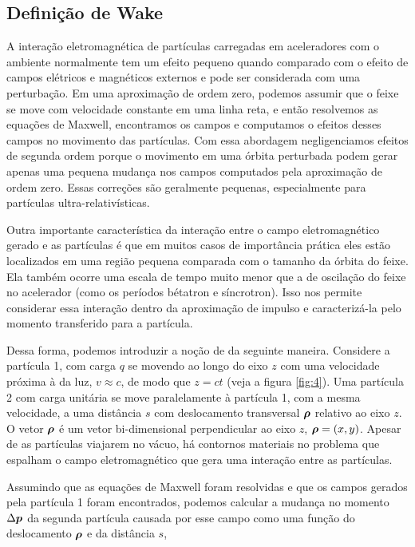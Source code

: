 \subsection{Definição de Wake}\label{ssec:wake_definition}

A interação eletromagnética de partículas carregadas em aceleradores com o ambiente normalmente tem um efeito pequeno quando comparado com o efeito de campos elétricos e magnéticos externos e pode ser considerada com uma perturbação. Em uma aproximação de ordem zero, podemos assumir que o feixe se move com velocidade constante em uma linha reta, e então resolvemos as equações de Maxwell, encontramos os campos e computamos o efeitos desses campos no movimento das partículas. Com essa abordagem negligenciamos efeitos de segunda ordem porque o movimento em uma órbita perturbada podem gerar apenas uma pequena mudança nos campos computados pela aproximação de ordem zero. Essas correções são geralmente pequenas, especialmente para partículas ultra-relativísticas.

Outra importante característica da interação entre o campo eletromagnético gerado e as partículas é que em muitos casos de importância prática eles estão localizados em uma região pequena comparada com o tamanho da órbita do feixe. Ela também ocorre uma escala de tempo muito menor que a de oscilação do feixe no acelerador (como os períodos bétatron e síncrotron). Isso nos permite considerar essa interação dentro da aproximação de impulso e caracterizá-la pelo momento transferido para a partícula.

Dessa forma, podemos introduzir a noção de  da seguinte maneira. Considere a partícula 1, com carga $q$ se movendo ao longo do eixo $z$ com uma velocidade próxima à da luz, $v\approx c$, de modo que $z=ct$ (veja a figura \ref{fig:4}). Uma partícula 2 com carga unitária se move paralelamente à partícula 1, com a mesma velocidade, a uma distância $s$ com deslocamento transversal $\boldsymbol{\rho}$ relativo ao eixo $z$. O vetor $\boldsymbol{\rho}$ é um vetor bi-dimensional perpendicular ao eixo $z$, $\boldsymbol{\rho} = (x,y)$. Apesar de as partículas viajarem no vácuo, há contornos materiais no problema que espalham o campo eletromagnético que gera uma interação entre as partículas.

Assumindo que as equações de Maxwell foram resolvidas e que os campos gerados pela partícula 1 foram encontrados, podemos calcular a mudança no momento $\Delta \boldsymbol{p}$ da segunda partícula causada por esse campo como uma função do deslocamento $\boldsymbol{\rho}$ e da distância $s$,

